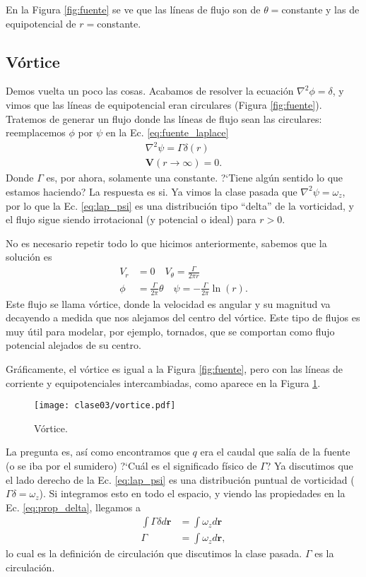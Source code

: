 En la Figura \ref{fig:fuente} se ve que las líneas de flujo son de $\theta=$constante y las de equipotencial de $r=$constante.

\subsection*{Vórtice}
Demos vuelta un poco las cosas.
Acabamos de resolver la ecuación $\nabla^2\phi=\delta$, y vimos que las líneas de equipotencial eran circulares (Figura \ref{fig:fuente}).
Tratemos de generar un flujo donde las líneas de flujo sean las circulares: reemplacemos $\phi$ por $\psi$ en la Ec. \eqref{eq:fuente_laplace}
%
\begin{align}\label{eq:lap_psi}
\nabla^2\psi=\Gamma\delta(r)\nonumber\\
\mathbf{V}(r\to\infty)=0.
\end{align}
%
Donde $\Gamma$ es, por ahora, solamente una constante.
\mbox{?`}Tiene algún sentido lo que estamos haciendo? La respuesta es si.
Ya vimos la clase pasada que $\nabla^2\psi=\omega_z$, por lo que la Ec. \eqref{eq:lap_psi} es una distribución tipo ``delta'' de la vorticidad, y el flujo sigue siendo irrotacional (y potencial o ideal) para $r>0$.

No es necesario repetir todo lo que hicimos anteriormente, sabemos que la solución es 
%
\begin{align}
V_r &= 0 \quad V_\theta=\frac{\Gamma}{2\pi r}\nonumber\\
\phi&=\frac{\Gamma}{2\pi}\theta \quad \psi = -\frac{\Gamma}{2\pi}\ln(r).
\end{align}
%
Este flujo se llama vórtice, donde la velocidad es angular y su magnitud va decayendo a medida que nos alejamos del centro del vórtice.
Este tipo de flujos es muy útil para modelar, por ejemplo, tornados, que se comportan como flujo potencial alejados de su centro.

Gráficamente, el vórtice es igual a la Figura \ref{fig:fuente}, pero con las líneas de corriente y equipotenciales intercambiadas, como aparece en la Figura \ref{fig:vortice}.

\begin{figure}[h!]
\centering
\texttt{[image: clase03/vortice.pdf]}
\caption{Vórtice.}
\label{fig:vortice}
\end{figure}

La pregunta es, así como encontramos que $q$ era el caudal que salía de la fuente (o se iba por el sumidero) \mbox{?`}Cuál es el significado físico de $\Gamma$?
Ya discutimos que el lado derecho de la Ec. \eqref{eq:lap_psi} es una distribución puntual de vorticidad ($\Gamma\delta=\omega_z$).
Si integramos esto en todo el espacio, y viendo las propiedades en la Ec. \eqref{eq:prop_delta}, llegamos a
%
\begin{align}
\int\Gamma\delta d\mathbf{r} &= \int\omega_z d\mathbf{r}\nonumber\\
\Gamma &= \int\omega_z d\mathbf{r},
\end{align}
%
lo cual es la definición de circulación que discutimos la clase pasada.
$\Gamma$ es la circulación.

